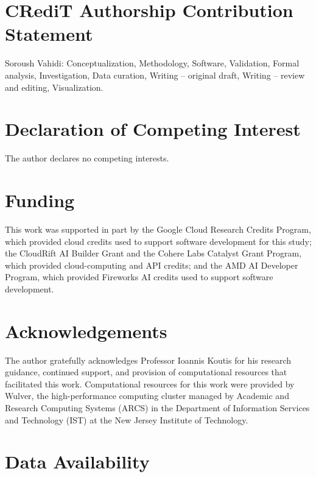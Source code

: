 \section*{CRediT Authorship Contribution Statement}

Soroush Vahidi: Conceptualization, Methodology, Software, Validation,
Formal analysis, Investigation, Data curation, Writing -- original draft,
Writing -- review and editing, Visualization.

\section*{Declaration of Competing Interest}

The author declares no competing interests.

\section*{Funding}

This work was supported in part by the Google Cloud Research Credits
Program, which provided cloud credits used to support software development
for this study; the CloudRift AI Builder Grant and the Cohere Labs Catalyst
Grant Program, which provided cloud-computing and API credits; and the AMD AI
Developer Program, which provided Fireworks AI credits used to support software
development.

\section*{Acknowledgements}

The author gratefully acknowledges Professor Ioannis Koutis for his research
guidance, continued support, and provision of computational resources that
facilitated this work. Computational resources for this work were provided by
Wulver, the high-performance computing cluster managed by Academic and
Research Computing Systems (ARCS) in the Department of Information Services
and Technology (IST) at the New Jersey Institute of Technology.

\section*{Data Availability}

